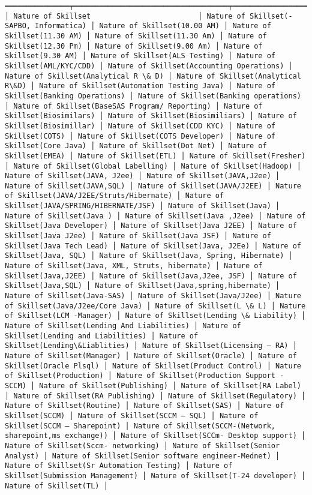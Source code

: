 \documentclass[11pt]{article}
\begin{document}
\begin{Verbatim}[commandchars=\\\{\}]
═══════════════╤════════════════════════════════════╤════════════════════════════════════════╤════════════════════════════════╤══════════════════════════╤═════════════════════════════╕
│ Nature of Skillset                         │ Nature of Skillset(- SAPBO, Informatica) │ Nature of Skillset(10.00 AM) │ Nature of Skillset(11.30 AM) │ Nature of Skillset(11.30 Am) │ Nature of Skillset(12.30 Pm) │ Nature of Skillset(9.00 Am) │ Nature of Skillset(9.30 AM) │ Nature of Skillset(ALS Testing) │ Nature of Skillset(AML/KYC/CDD) │ Nature of Skillset(Accounting Operations) │ Nature of Skillset(Analytical R \& D) │ Nature of Skillset(Analytical R\&D) │ Nature of Skillset(Automation Testing Java) │ Nature of Skillset(Banking Operations) │ Nature of Skillset(Banking operations) │ Nature of Skillset(BaseSAS Program/ Reporting) │ Nature of Skillset(Biosimilars) │ Nature of Skillset(Biosimiliars) │ Nature of Skillset(Biosimillar) │ Nature of Skillset(CDD KYC) │ Nature of Skillset(COTS) │ Nature of Skillset(COTS Developer) │ Nature of Skillset(Core Java) │ Nature of Skillset(Dot Net) │ Nature of Skillset(EMEA) │ Nature of Skillset(ETL) │ Nature of Skillset(Fresher) │ Nature of Skillset(Global Labelling) │ Nature of Skillset(Hadoop) │ Nature of Skillset(JAVA, J2ee) │ Nature of Skillset(JAVA,J2ee) │ Nature of Skillset(JAVA,SQL) │ Nature of Skillset(JAVA/J2EE) │ Nature of Skillset(JAVA/J2EE/Struts/Hibernate) │ Nature of Skillset(JAVA/SPRING/HIBERNATE/JSF) │ Nature of Skillset(Java) │ Nature of Skillset(Java ) │ Nature of Skillset(Java ,J2ee) │ Nature of Skillset(Java Developer) │ Nature of Skillset(Java J2EE) │ Nature of Skillset(Java J2ee) │ Nature of Skillset(Java JSF) │ Nature of Skillset(Java Tech Lead) │ Nature of Skillset(Java, J2Ee) │ Nature of Skillset(Java, SQL) │ Nature of Skillset(Java, Spring, Hibernate) │ Nature of Skillset(Java, XML, Struts, hibernate) │ Nature of Skillset(Java,J2EE) │ Nature of Skillset(Java,J2ee, JSF) │ Nature of Skillset(Java,SQL) │ Nature of Skillset(Java,spring,hibernate) │ Nature of Skillset(Java-SAS) │ Nature of Skillset(Java/J2ee) │ Nature of Skillset(Java/J2ee/Core Java) │ Nature of Skillset(L \& L) │ Nature of Skillset(LCM -Manager) │ Nature of Skillset(Lending \& Liability) │ Nature of Skillset(Lending And Liabilities) │ Nature of Skillset(Lending and Liabilities) │ Nature of Skillset(Lending\&Liablities) │ Nature of Skillset(Licensing – RA) │ Nature of Skillset(Manager) │ Nature of Skillset(Oracle) │ Nature of Skillset(Oracle Plsql) │ Nature of Skillset(Product Control) │ Nature of Skillset(Production) │ Nature of Skillset(Production Support - SCCM) │ Nature of Skillset(Publishing) │ Nature of Skillset(RA Label) │ Nature of Skillset(RA Publishing) │ Nature of Skillset(Regulatory) │ Nature of Skillset(Routine) │ Nature of Skillset(SAS) │ Nature of Skillset(SCCM) │ Nature of Skillset(SCCM – SQL) │ Nature of Skillset(SCCM – Sharepoint) │ Nature of Skillset(SCCM-(Network, sharepoint,ms exchange)) │ Nature of Skillset(SCCm- Desktop support) │ Nature of Skillset(Sccm- networking) │ Nature of Skillset(Senior Analyst) │ Nature of Skillset(Senior software engineer-Mednet) │ Nature of Skillset(Sr Automation Testing) │ Nature of Skillset(Submission Management) │ Nature of Skillset(T-24 developer) │ Nature of Skillset(TL) │ 
\end{Verbatim}
\end{document}
